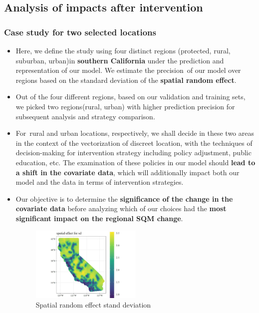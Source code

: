 \documentclass{mcmthesis}
\begin{document}
\subsection{Analysis of impacts after intervention}
\subsubsection{Case study for two selected locations}

\begin{itemize}

\item Here, we define the study using four distinct regions (protected, rural, suburban, urban)in \textbf{southern California} under the prediction and representation of our model. We estimate the precision of our model over regions based on the standard deviation of the \textbf{spatial random effect}.

\item Out of the four different regions, based on our validation and training sets, we picked two regions(rural, urban) with higher prediction precision for subsequent analysis and strategy comparison.

\item For rural and urban locations, respectively, we shall decide in these two areas in the context of the vectorization of discreet location, with the techniques of decision-making for intervention strategy including policy adjustment, public education, etc. The examination of these policies in our model should \textbf{lead to a shift in the covariate data}, which will additionally impact both our model and the data in terms of intervention strategies.

\item Our objective is to determine the \textbf{significance of the change in the covariate data} before analyzing which of our choices had the \textbf{most significant impact on the regional SQM change}.

\begin{figure}[htb]
    \centering
    \includegraphics[width=0.5\textwidth]{images/random effect sd.jpg}
    \caption{Spatial random effect stand deviation}
    \label{pre1}
\end{figure}


\end{itemize}
\end{document}
